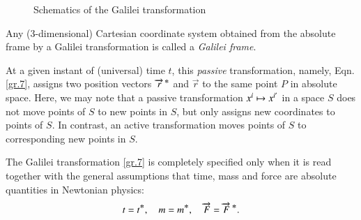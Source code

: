 \begin{figure}
\begin{center}
\caption{Schematics of the Galilei transformation}
\label{fig1.1}
\end{center}
\end{figure}

\dfn Any (3-dimensional)  Cartesian coordinate system 
obtained from the absolute frame by a Galilei transformation 
is called a \textsl{Galilei frame}. 
\enlargethispage*{1\bsk}

At a given instant of (universal) time $t$, this 
\textsl{passive} transformation, namely, Eqn.\eqref{gr.7}, 
assigns two position vectors ${\overrightarrow{r}^{\,{\textstyle \ast}}}$ and $\vec{r}$ to the 
same point $P$ in absolute space. Here, we may note that a 
passive transformation  $x^i\mapsto x^{{i'}}$  in a space 
$S$ does not move points of $S$ to new points in $S$, but 
only assigns new coordinates to  points of $S$. In contrast, 
an {active} transformation moves points of $S$ to 
corresponding new points in $S$.

The Galilei transformation \eqref{gr.7} is completely 
specified only when it is read together with the general 
assumptions that time, mass and force are absolute 
quantities in Newtonian physics:
\begin{align}\label{gr.8}
t=t^{\textstyle \ast},\quad m = m^{\textstyle \ast},\quad \overrightarrow{F} = 
\overrightarrow{F}\,^{\textstyle \ast} .
\end{align}

